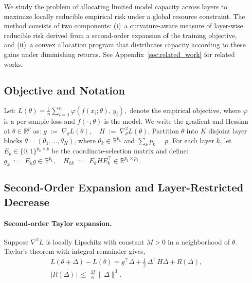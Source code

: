 \documentclass[accepted]{uai2026}%
\theoremstyle{remark}%
\begin{document}
We study the problem of allocating limited model capacity across layers
to maximize locally reducible empirical risk under a global resource constraint.
The method consists of two components:
(i)~a curvature-aware measure of layer-wise reducible risk derived from a
second-order expansion of the training objective, and
(ii)~a convex allocation program that distributes capacity according to these
gains under diminishing returns. See Appendix~\ref{sec:related_work} for related works.

\subsection{Objective and Notation}

Let:
\(
  L(\theta)
  = \frac{1}{n}\sum_{i=1}^{n} \varphi\!\left(f(x_i;\theta),\, y_i\right),
\)
denote the empirical objective, where $\varphi$ is a per-sample loss
and $f(\cdot\,;\theta)$ is the model.
We write the gradient and Hessian at $\theta \in \mathbb{R}^{p}$ as:
\(
  g \;:=\; \nabla_{\theta} L(\theta),
  \quad
  H \;:=\; \nabla_{\theta}^{2} L(\theta).
\)
Partition $\theta$ into $K$ disjoint layer blocks
$\theta = (\theta_1, \ldots, \theta_K)$, where $\theta_k \in \mathbb{R}^{p_k}$
and $\sum_{k} p_k = p$.
For each layer $k$, let $E_k \in \{0,1\}^{p_k \times p}$ be the
coordinate-selection matrix and define:
\(  g_k \;:=\; E_k g \in \mathbb{R}^{p_k},
   \quad
  H_{kk} \;:=\; E_k H E_k^{\top} \in \mathbb{R}^{p_k \times p_k}.
\)

\vspace{2mm}
\subsection{Second-Order Expansion and Layer-Restricted Decrease}
\label{sec:secondorder}

\paragraph{Second-order Taylor expansion.}
Suppose $\nabla^{2} L$ is locally Lipschitz with constant $M > 0$
in a neighborhood of $\theta$. 
Taylor's theorem with integral remainder gives, \\
\begin{multline}
  \label{eq:taylor}
  L(\theta + \Delta) - L(\theta)
  =
  g^{\top}\Delta
  + \frac{1}{2}\,\Delta^{\top} H \Delta
  + R(\Delta),
  \\
  |R(\Delta)| \;\le\; \frac{M}{6}\,\|\Delta\|^{3}.
\end{multline}
\end{document}
